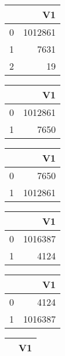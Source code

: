 \bigskip\bigskip
\centering
\begin{tabular}{rr}
  \hline
 & V1 \\ 
  \hline
0 & 1012861 \\ 
  1 & 7631 \\ 
  2 &  19 \\ 
   \hline
\end{tabular}

\bigskip\bigskip
\centering
\begin{tabular}{rr}
  \hline
 & V1 \\ 
  \hline
0 & 1012861 \\ 
  1 & 7650 \\ 
   \hline
\end{tabular}

\bigskip\bigskip
\centering
\begin{tabular}{rr}
  \hline
 & V1 \\ 
  \hline
0 & 7650 \\ 
  1 & 1012861 \\ 
   \hline
\end{tabular}

\bigskip\bigskip
\centering
\begin{tabular}{rr}
  \hline
 & V1 \\ 
  \hline
0 & 1016387 \\ 
  1 & 4124 \\ 
   \hline
\end{tabular}

\bigskip\bigskip
\centering
\begin{tabular}{rr}
  \hline
 & V1 \\ 
  \hline
0 & 4124 \\ 
  1 & 1016387 \\ 
   \hline
\end{tabular}

\bigskip\bigskip
\centering
\begin{tabular}{rr}
  \hline
 & V1 \\ 
  \hline
\hline
\end{tabular}

